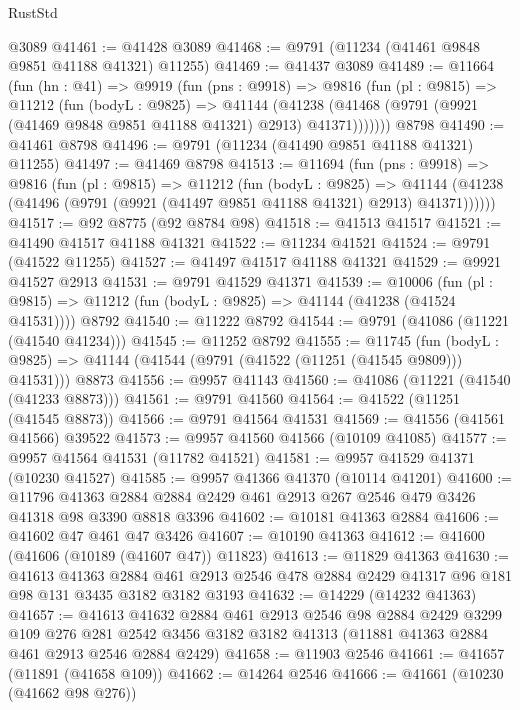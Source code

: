 \begin{lexlean}{RustStd}
\begin{coremodule}
    @3089
@41461 := @41428 @3089
@41468 := @9791 (@11234 (@41461 @9848 @9851 @41188 @41321) @11255)
@41469 := @41437 @3089
@41489 := @11664
    (fun (hn : @41) =>
    @9919
      (fun (pns : @9918) =>
      @9816
        (fun (pl : @9815) =>
        @11212
          (fun (bodyL : @9825) =>
          @41144
            (@41238 (@41468 (@9791 (@9921 (@41469 @9848 @9851 @41188 @41321) @2913) @41371)))))))
    @8798
@41490 := @41461 @8798
@41496 := @9791 (@11234 (@41490 @9851 @41188 @41321) @11255)
@41497 := @41469 @8798
@41513 := @11694
    (fun (pns : @9918) =>
    @9816
      (fun (pl : @9815) =>
      @11212
        (fun (bodyL : @9825) =>
        @41144 (@41238 (@41496 (@9791 (@9921 (@41497 @9851 @41188 @41321) @2913) @41371))))))
@41517 := @92 @8775 (@92 @8784 @98)
@41518 := @41513 @41517
@41521 := @41490 @41517 @41188 @41321
@41522 := @11234 @41521
@41524 := @9791 (@41522 @11255)
@41527 := @41497 @41517 @41188 @41321
@41529 := @9921 @41527 @2913
@41531 := @9791 @41529 @41371
@41539 := @10006
    (fun (pl : @9815) => @11212 (fun (bodyL : @9825) => @41144 (@41238 (@41524 @41531))))
    @8792
@41540 := @11222 @8792
@41544 := @9791 (@41086 (@11221 (@41540 @41234)))
@41545 := @11252 @8792
@41555 := @11745
    (fun (bodyL : @9825) => @41144 (@41544 (@9791 (@41522 (@11251 (@41545 @9809))) @41531)))
    @8873
@41556 := @9957 @41143
@41560 := @41086 (@11221 (@41540 (@41233 @8873)))
@41561 := @9791 @41560
@41564 := @41522 (@11251 (@41545 @8873))
@41566 := @9791 @41564 @41531
@41569 := @41556 (@41561 @41566) @39522
@41573 := @9957 @41560 @41566 (@10109 @41085)
@41577 := @9957 @41564 @41531 (@11782 @41521)
@41581 := @9957 @41529 @41371 (@10230 @41527)
@41585 := @9957 @41366 @41370 (@10114 @41201)
@41600 := @11796
    @41363
    @2884
    @2884
    @2429
    @461
    @2913
    @267
    @2546
    @479
    @3426
    @41318
    @98
    @3390
    @8818
    @3396
@41602 := @10181 @41363 @2884
@41606 := @41602 @47 @461 @47 @3426
@41607 := @10190 @41363
@41612 := @41600 (@41606 (@10189 (@41607 @47)) @11823)
@41613 := @11829 @41363
@41630 := @41613
    @41363
    @2884
    @461
    @2913
    @2546
    @478
    @2884
    @2429
    @41317
    @96
    @181
    @98
    @131
    @3435
    @3182
    @3182
    @3193
@41632 := @14229 (@14232 @41363)
@41657 := @41613
    @41632
    @2884
    @461
    @2913
    @2546
    @98
    @2884
    @2429
    @3299
    @109
    @276
    @281
    @2542
    @3456
    @3182
    @3182
    @41313
    (@11881 @41363 @2884 @461 @2913 @2546 @2884 @2429)
@41658 := @11903 @2546
@41661 := @41657 (@11891 (@41658 @109))
@41662 := @14264 @2546
@41666 := @41661 (@10230 (@41662 @98 @276))

\end{coremodule}
\end{lexlean}
